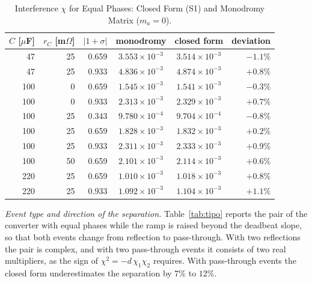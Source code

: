 \documentclass[journal]{IEEEtran}
\begin{document}
\begin{table}[!h]
\caption{Interference $\chi$ for Equal Phases: Closed Form (S1) and
Monodromy Matrix ($m_a=0$).}
\label{tab:chi}
\centering
\footnotesize
\setlength{\tabcolsep}{4pt}
\begin{tabular}{@{}rrrccr@{}}
\toprule
$C$ [$\mu$F] & $r_C$ [m$\Omega$] & $\lvert1+\sigma\rvert$ & monodromy & closed form & deviation \\
\midrule
47 & 25 & 0.659 & $3.553\times10^{-3}$ & $3.514\times10^{-3}$ & $-1.1\%$ \\
47 & 25 & 0.933 & $4.836\times10^{-3}$ & $4.874\times10^{-3}$ & $+0.8\%$ \\
100 & 0 & 0.659 & $1.545\times10^{-3}$ & $1.541\times10^{-3}$ & $-0.3\%$ \\
100 & 0 & 0.933 & $2.313\times10^{-3}$ & $2.329\times10^{-3}$ & $+0.7\%$ \\
100 & 25 & 0.343 & $9.780\times10^{-4}$ & $9.704\times10^{-4}$ & $-0.8\%$ \\
100 & 25 & 0.659 & $1.828\times10^{-3}$ & $1.832\times10^{-3}$ & $+0.2\%$ \\
100 & 25 & 0.933 & $2.311\times10^{-3}$ & $2.333\times10^{-3}$ & $+0.9\%$ \\
100 & 50 & 0.659 & $2.101\times10^{-3}$ & $2.114\times10^{-3}$ & $+0.6\%$ \\
220 & 25 & 0.659 & $1.010\times10^{-3}$ & $1.018\times10^{-3}$ & $+0.8\%$ \\
220 & 25 & 0.933 & $1.092\times10^{-3}$ & $1.104\times10^{-3}$ & $+1.1\%$ \\
\bottomrule
\end{tabular}
\end{table}

\emph{Event type and direction of the separation.} Table~\ref{tab:tipo}
reports the pair of the converter with equal phases while the ramp is raised
beyond the deadbeat slope, so that both events change from reflection to
pass-through. With two reflections the pair is complex, and with two
pass-through events it consists of two real multipliers, as the sign of
$\chi^{2}=-d\,\chi_1\chi_2$ requires. With pass-through events the closed form
underestimates the separation by $7\%$ to $12\%$.
\end{document}
